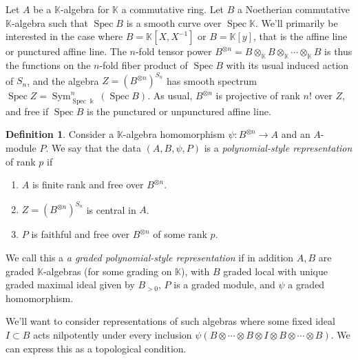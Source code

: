 \documentclass[10pt]{article}
\theoremstyle{definition}
\newtheorem{defi}[theorem]{Definition}
\DeclareMathOperator{\Spec}{Spec}
\DeclareMathOperator{\Sym}{Sym}
\newcommand{\K}{\Bbbk}%
\begin{document}
 Let $A$ be a $\mathbb{K}$-algebra for $\mathbb{K}$ a commutative
 ring. Let $B$ a Noetherian commutative $\mathbb{K}$-algebra such
 that $\Spec B$ is a smooth curve over $\Spec \mathbb{K}$. We'll
 primarily be interested in the case where $B=\mathbb{K}[X,X^{-1}]$
 or $B=\mathbb{K}[y]$, that is the affine line or punctured affine
 line. The $n$-fold tensor power $B^{\otimes
 n}=B\otimes_{\mathbb{K}} B\otimes_{\mathbb{K}} \cdots
 \otimes_{\mathbb{K}} B$ is thus the functions on the $n$-fold fiber
 product of $\Spec B$ with its usual induced action of $S_n$, and the
 algebra $Z=(B^{\otimes n})^{S_n}$ has smooth spectrum $\Spec
 Z=\Sym^n_{\Spec\K}(\Spec B)$. As usual, $B^{\otimes n}$ is projective of
 rank $n!$ over $Z$, and free if $\Spec B$ is the punctured or
 unpunctured affine line.
\begin{defi}
 Consider a $\mathbb{K}$-algebra homomorphism $\psi\colon B^{\otimes
 n}\to A$ and an $A$-module $P$. We say that the data $(A,B,\psi,P)$ is a
 \emph{polynomial-style representation} of rank $p$ if 
 \begin{enumerate}
 \item $A$ is finite rank and free over $B^{\otimes n}$.
 \item $Z=(B^{\otimes n})^{S_n}$ is central in $A$.
 \item $P$ is faithful and free
 over $B^{\otimes n} $ of some rank $p$.
 \end{enumerate}
 We call this a \emph{a graded polynomial-style representation} if in
 addition $A, B$ are graded $\mathbb{K}$-algebras (for some grading
 on $\mathbb{K}$), with $B$ graded local with unique
 graded maximal ideal given by $B_{>0}$, $P$ is a graded module, and $\psi$ a graded
 homomorphism. 
\end{defi}

We'll want to consider representations of such algebras where some fixed
ideal $I\subset B$ acts nilpotently under every inclusion
$\psi(B\otimes \cdots \otimes B\otimes I \otimes B\otimes \cdots \otimes B)$. We can
express this as a topological condition.
\end{document}
